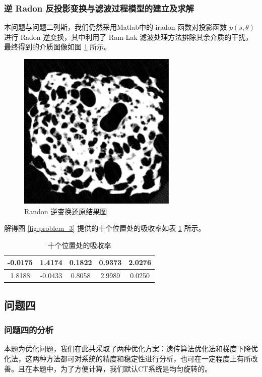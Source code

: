 \documentclass[UTF8]{ctexart}
\begin{document}
\subsubsection{逆 Radon 反投影变换与滤波过程模型的建立及求解}

本问题与问题二列斯，我们仍然采用Matlab中的 iradon 函数对投影函数 $p(s,\theta)$ 进行 Radon 逆变换，其中利用了 Ram-Lak 滤波处理方法排除其余介质的干扰，最终得到的介质图像如图 \ref{fig:answer_3} 所示。

\begin{figure}[htbp]
  \centering
  \includegraphics[width=3in]{../figure/answer_3.png}
  \caption{Randon 逆变换还原结果图}
  \label{fig:answer_3}
\end{figure}

解得图 \ref{fig:problem_3} 提供的十个位置处的吸收率如表 \ref{problem_3} 所示。

\begin{table}[htbp]
\centering
\caption{十个位置处的吸收率}
\label{problem_3}
\begin{tabular}{ccccc}
\hline
-0.0175 & 1.4174 & 0.1822 & 0.9373 & 2.0276  \\
\hline
1.8188 & -0.0433 & 0.8058 & 2.9989 & 0.0250  \\
\hline
\end{tabular}
\end{table}

\subsection{问题四}
\subsubsection{问题四的分析}

本题为优化问题，我们在此共采取了两种优化方案：遗传算法优化法和梯度下降优化法，这两种方法都可对系统的精度和稳定性进行分析，也可在一定程度上有所改善。且在本题中，为了方便计算，我们默认CT系统是均匀旋转的。
\end{document}
